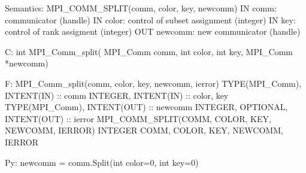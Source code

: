 Semantics:
MPI_COMM_SPLIT(comm, color, key, newcomm)
IN comm: communicator (handle)
IN color: control of subset assignment (integer)
IN key: control of rank assigment (integer)
OUT newcomm: new communicator (handle)

C:
int MPI_Comm_split(
    MPI_Comm comm, int color, int key,
    MPI_Comm *newcomm)

F:
MPI_Comm_split(comm, color, key, newcomm, ierror)
TYPE(MPI_Comm), INTENT(IN) :: comm
INTEGER, INTENT(IN) :: color, key
TYPE(MPI_Comm), INTENT(OUT) :: newcomm
INTEGER, OPTIONAL, INTENT(OUT) :: ierror
MPI_COMM_SPLIT(COMM, COLOR, KEY, NEWCOMM, IERROR)
INTEGER COMM, COLOR, KEY, NEWCOMM, IERROR

Py:
newcomm = comm.Split(int color=0, int key=0)
